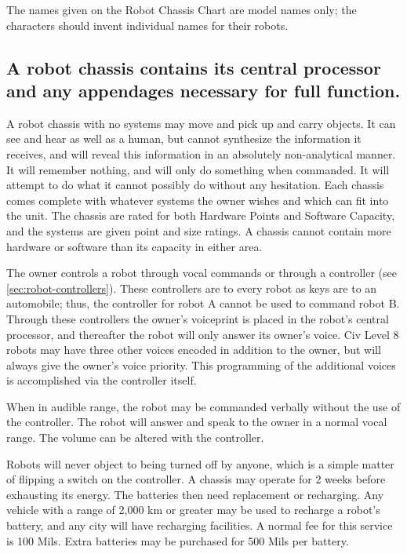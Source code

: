 The
names given on the Robot Chassis Chart are model names only; the
characters should invent individual names for their robots.

\subsection[Robot Chassis]{A robot chassis contains its central
  processor and any appendages necessary for full function.}
\label{sec:robot-chassis}

A robot chassis with no systems may move and pick up and carry
objects. It can see and hear as well as a human, but cannot synthesize
the information it receives, and will reveal this information in an
absolutely non-analytical manner. It will remember nothing, and will
only do something when commanded. It will attempt to do what it cannot
possibly do without any hesitation. Each chassis comes complete with
whatever systems the owner wishes and which can fit into the unit. The
chassis are rated for both Hardware Points and Software Capacity, and
the systems are given point and size ratings. A chassis cannot contain
more hardware or software than its capacity in either area.

The owner controls a robot through vocal commands or through a
controller (see \ref{sec:robot-controllers}). These controllers are to
every robot as keys are to an automobile; thus, the controller for
robot A cannot be used to command robot B. Through these controllers
the owner's voiceprint is placed in the robot's central processor, and
thereafter the robot will only answer its owner's voice. Civ Level 8
robots may have three other voices encoded in addition to the owner,
but will always give the owner's voice priority. This programming of
the additional voices is accomplished via the controller itself.

When in audible range, the robot may be commanded verbally without the
use of the controller. The robot will answer and speak to the owner in
a normal vocal range. The volume can be altered with the controller.

Robots will never object to being turned off by anyone, which is a
simple matter of flipping a switch on the controller. A chassis may
operate for 2 weeks before exhausting its energy. The batteries then
need replacement or recharging. Any vehicle with a range of 2,000 km
or greater may be used to recharge a robot's battery, and any city
will have recharging facilities. A normal fee for this service is 100
Mils. Extra batteries may be purchased for 500 Mils per battery.

